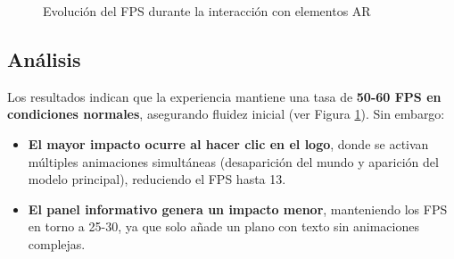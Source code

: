 \begin{figure}[H]
\centering
{}
\caption{Evolución del FPS durante la interacción con elementos AR}
\label{fig:fps-evolucion}
\end{figure}


\subsection{Análisis}
Los resultados indican que la experiencia mantiene una tasa de \textbf{50-60 FPS en condiciones normales}, asegurando fluidez inicial (ver Figura \ref{fig:fps-evolucion}). Sin embargo:
\begin{itemize}
    \item \textbf{El mayor impacto ocurre al hacer clic en el logo}, donde se activan múltiples animaciones simultáneas (desaparición del mundo y aparición del modelo principal), reduciendo el FPS hasta 13.
    \item \textbf{El panel informativo genera un impacto menor}, manteniendo los FPS en torno a 25-30, ya que solo añade un plano con texto sin animaciones complejas.
\end{itemize}

